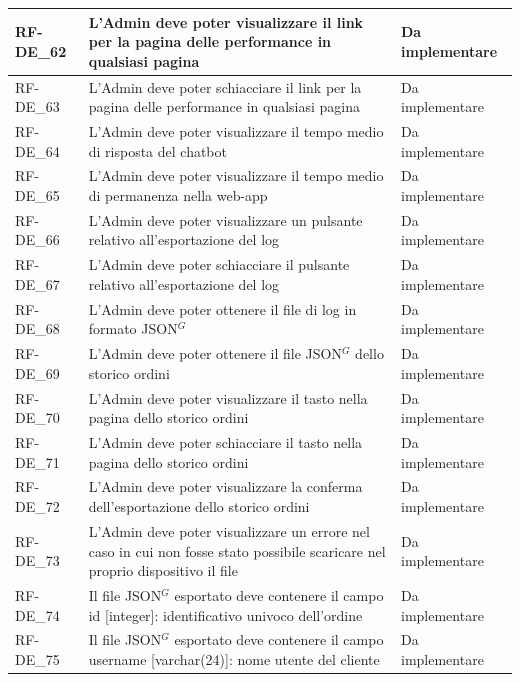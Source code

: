\begin{longtable}{|>{\raggedright}p{}|>{\raggedright\arraybackslash}p{}|>{\raggedright\arraybackslash}p{}|}
	\hline
	RF-DE\_62 \hypertarget{rf-de_62} & L'Admin deve poter visualizzare il link per la pagina delle performance in qualsiasi pagina & Da implementare \\
	\hline
	RF-DE\_63 \hypertarget{rf-de_63} & L'Admin deve poter schiacciare il link per la pagina delle performance in qualsiasi pagina & Da implementare \\
	\hline
	RF-DE\_64 \hypertarget{rf-de_64} & L'Admin deve poter visualizzare il tempo medio di risposta del chatbot & Da implementare \\
	\hline
	RF-DE\_65 \hypertarget{rf-de_65} & L'Admin deve poter visualizzare il tempo medio di permanenza nella web-app & Da implementare \\
	\hline
	RF-DE\_66 \hypertarget{rf-de_66} & L'Admin deve poter visualizzare un pulsante relativo all'esportazione del log & Da implementare \\
	\hline
	RF-DE\_67 \hypertarget{rf-de_67} & L'Admin deve poter schiacciare il pulsante relativo all'esportazione del log & Da implementare \\
	\hline
	RF-DE\_68 \hypertarget{rf-de_68} & L'Admin deve poter ottenere il file di log in formato JSON$^G$ & Da implementare \\
	\hline
	RF-DE\_69 \hypertarget{rf-de_69} & L'Admin deve poter ottenere il file JSON$^G$ dello storico ordini & Da implementare \\
	\hline
	RF-DE\_70 \hypertarget{rf-de_70} & L'Admin deve poter visualizzare il tasto \vr{Esporta} nella pagina dello storico ordini & Da implementare \\
	\hline
	RF-DE\_71 \hypertarget{rf-de_71} & L'Admin deve poter schiacciare il tasto \vr{Esporta} nella pagina dello storico ordini & Da implementare \\
	\hline
	RF-DE\_72 \hypertarget{rf-de_72} & L'Admin deve poter visualizzare la conferma dell'esportazione dello storico ordini & Da implementare \\
	\hline
	RF-DE\_73 \hypertarget{rf-de_73} & L'Admin deve poter visualizzare un errore nel caso in cui non fosse stato possibile scaricare nel proprio dispositivo il file & Da implementare \\
	\hline
	RF-DE\_74 \hypertarget{rf-de_74} & Il file JSON$^G$ esportato deve contenere il campo id [integer]: identificativo univoco dell'ordine & Da implementare \\
	\hline
	RF-DE\_75 \hypertarget{rf-de_75} & Il file JSON$^G$ esportato deve contenere il campo username [varchar(24)]: nome utente del cliente & Da implementare \\

\end{longtable}

